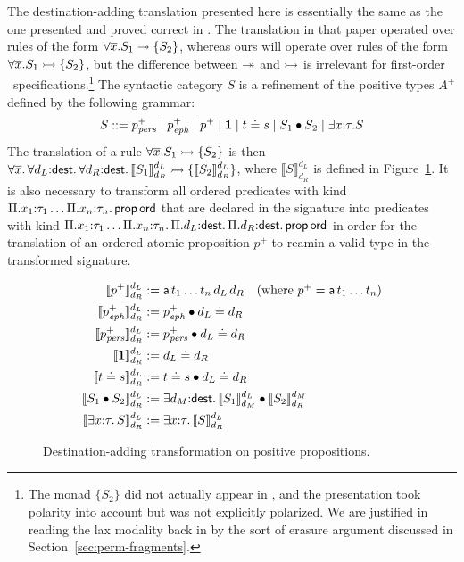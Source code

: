 The destination-adding translation presented here is essentially the
same as the one presented and proved correct in
\cite{simmons11logical}. The translation in that paper operated over
rules of the form $\forall \overline{x}. S_1 \twoheadrightarrow \{ S_2 \}$,
whereas ours will operate over rules of the form $\forall
\overline{x}. S_1 \rightarrowtail \{ S_2 \}$, but the difference between
$\twoheadrightarrow$ and $\rightarrowtail$ is irrelevant for first-order
\sls~specifications.\footnote{The monad $\{ S_2 \}$ did not actually
  appear in \cite{simmons11logical}, and the presentation took
  polarity into account but was not explicitly polarized. We are
  justified in reading the lax modality back in by the sort of erasure
  argument discussed in Section~\ref{sec:perm-fragments}.} The syntactic
category $S$ is a refinement of the positive types $A^+$ defined by
the following grammar:
\[
S ::= p^+_{\it pers} \mid p^+_{\it eph} \mid p^+ \mid \mathbf{1}
\mid t \doteq s \mid S_1 \mathbin{\bullet} S_2 \mid \exists x{:}\tau. S
\]
The translation of a rule $\forall \overline{x}. S_1 \rightarrowtail \{ S_2 \}$
is then $\forall \overline{x}.\, \forall d_L{:}{\sf dest}.\, \forall
d_R{:}{\sf dest}.\, \llbracket S_1 \rrbracket^{d_L}_{d_R} \rightarrowtail \{
\llbracket S_2 \rrbracket^{d_L}_{d_R} \}$, where $\llbracket S
\rrbracket^{d_L}_{d_R}$ is defined in Figure~\ref{fig:destadd-pos}. It
is also necessary to transform all ordered predicates with kind
$\Pi. x_1{:}\tau_1\ldots \Pi.x_n{:}\tau_n.\,{\sf prop\,ord}$ that are
declared in the signature into predicates with kind
$\Pi. x_1{:}\tau_1\ldots \Pi.x_n{:}\tau_n.\, \Pi.d_L{:}{\sf dest}.\,
\Pi.d_R{:}{\sf dest}.\, {\sf prop\,ord}$ in order for the translation
of an ordered atomic proposition $p^+$ to reamin a valid type in
the transformed signature.

\begin{figure}
\begin{align*}
\llbracket p^+ \rrbracket^{d_L}_{d_R} & := 
 {\sf a}\,t_1\ldots t_n\,d_L\,d_R ~~~ \mbox{(where $p^+ = {\sf a}\,t_1\ldots t_n$)}
\\
\llbracket p^+_{\it eph} \rrbracket^{d_L}_{d_R} & := p^+_{\it eph} \mathbin{\bullet} d_L \doteq d_R
\\
\llbracket p^+_{\it pers} \rrbracket^{d_L}_{d_R} & := p^+_{\it pers} \mathbin{\bullet} d_L \doteq d_R
\\
\llbracket \mathbf{1} \rrbracket^{d_L}_{d_R} & := d_L \doteq d_R
\\
\llbracket t \doteq s \rrbracket^{d_L}_{d_R} & := t \doteq s \mathbin{\bullet} d_L \doteq d_R
\\
\llbracket S_1 \mathbin{\bullet} S_2 \rrbracket^{d_L}_{d_R} & := 
 \exists d_M{:}{\sf dest}.\, 
   \llbracket S_1 \rrbracket^{d_L}_{d_M}
   \mathbin{\bullet}
   \llbracket S_2 \rrbracket^{d_M}_{d_R}
\\
\llbracket \exists x{:}\tau.\,S \rrbracket^{d_L}_{d_R} & := 
 \exists x{:}\tau.\, \llbracket S \rrbracket^{d_L}_{d_R}
\end{align*}
\caption{Destination-adding transformation on positive propositions.}
\label{fig:destadd-pos}
\end{figure}

